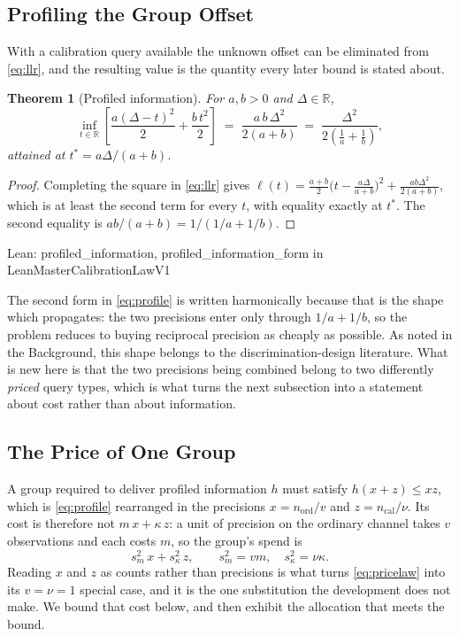\documentclass[conference]{IEEEtran}
\newtheorem{theorem}{Theorem}
\theoremstyle{definition}
\newcommand{\lean}[1]{\textsf{\footnotesize #1}}
\newcommand{\leanbox}[1]{%
  \par\vspace{2pt}\noindent
  {\footnotesize\textsf{Lean: #1}}\par\vspace{2pt}}
\begin{document}
\subsection{Profiling the Group Offset}
\label{sec:profile}

With a calibration query available the unknown offset can be eliminated from
\eqref{eq:llr}, and the resulting value is the quantity every later bound is stated about.

\begin{theorem}[Profiled information]
\label{thm:profile}
For $a,b>0$ and $\Delta\in\mathbb{R}$,
\begin{equation}
\inf_{t\in\mathbb{R}}\left[\frac{a(\Delta-t)^{2}}{2}+\frac{b\,t^{2}}{2}\right]
\;=\;\frac{a\,b\,\Delta^{2}}{2(a+b)}
\;=\;\frac{\Delta^{2}}{2\left(\frac{1}{a}+\frac{1}{b}\right)} ,
\label{eq:profile}
\end{equation}
attained at $t^{*}=a\Delta/(a+b)$.
\end{theorem}

\begin{proof}
Completing the square in \eqref{eq:llr} gives
$\ell(t)=\tfrac{a+b}{2}\bigl(t-\tfrac{a\Delta}{a+b}\bigr)^{2}+\tfrac{ab\Delta^{2}}{2(a+b)}$,
which is at least the second term for every $t$, with equality exactly at $t^{*}$. The
second equality is $ab/(a+b)=1/(1/a+1/b)$.
\end{proof}

\leanbox{\lean{profiled\_information}, \lean{profiled\_information\_form} in
\lean{LeanMasterCalibrationLawV1}}

The second form in \eqref{eq:profile} is written harmonically because that is the shape
which propagates: the two precisions enter only through $1/a+1/b$, so the problem reduces to
buying reciprocal precision as cheaply as possible. As noted in the Background, this shape
belongs to the discrimination-design literature. What is new here is that the two precisions
being combined belong to two differently \emph{priced} query types, which is what turns the
next subsection into a statement about cost rather than about information.

\subsection{The Price of One Group}
\label{sec:groupcost}

A group required to deliver profiled information $h$ must satisfy $h(x+z)\le xz$, which is
\eqref{eq:profile} rearranged in the precisions $x=n_{\mathrm{ord}}/v$ and
$z=n_{\mathrm{cal}}/\nu$. Its cost is therefore not $m\,x+\kappa\,z$: a unit of precision on
the ordinary channel takes $v$ observations and each costs $m$, so the group's spend is
\begin{equation}
s_{m}^{2}\,x + s_{\kappa}^{2}\,z, \qquad s_{m}^{2}=vm,\quad s_{\kappa}^{2}=\nu\kappa .
\label{eq:groupcost}
\end{equation}
Reading $x$ and $z$ as counts rather than precisions is what turns \eqref{eq:pricelaw} into
its $v=\nu=1$ special case, and it is the one substitution the development does not make. We
bound that cost below, and then exhibit the allocation that meets the bound.
\end{document}
